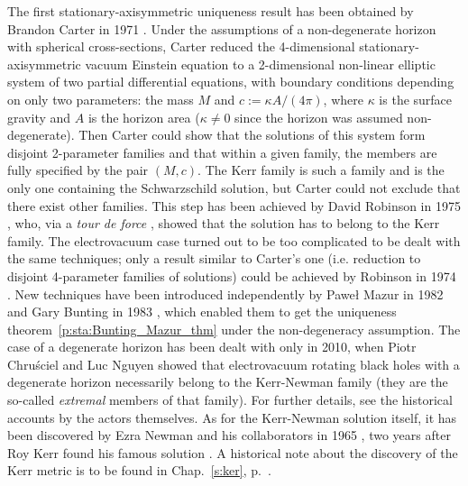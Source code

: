\begin{hist}
\label{h:sta:axisym_uniqueness}
The first stationary-axisymmetric uniqueness result has been obtained
by Brandon Carter in 1971 \cite{Carte71}. Under the
assumptions of a non-degenerate horizon with spherical cross-sections,
Carter reduced the 4-dimensional stationary-axisymmetric
vacuum Einstein equation to a 2-dimensional non-linear elliptic system
of two partial differential equations,
with boundary conditions depending on only two parameters: the mass $M$
and $c := \kappa A/(4\pi)$, where $\kappa$ is the surface gravity and $A$
is the horizon area ($\kappa \neq 0$ since the horizon was assumed non-degenerate).
Then Carter could show that the solutions
of this system form disjoint 2-parameter families and that within a given family,
the members are fully specified by the pair $(M, c)$. The Kerr family is
such a family and is the only one containing the Schwarzschild solution, but
Carter could not exclude that there exist other families. This step has been achieved
by David Robinson in 1975 \cite{Robin75}, who,
via a \emph{tour de force} \cite{Carte99}, showed
that the solution has to belong to the Kerr family.
The electrovacuum case turned out to be too complicated
to be dealt with the same techniques; only a result similar to Carter's
one (i.e. reduction to disjoint 4-parameter families of solutions)
could be achieved by Robinson in 1974 \cite{Robin74}.
New techniques have been introduced independently
by Pawe\l{} Mazur in 1982 \cite{Mazur82} and
Gary Bunting in 1983 \cite{Bunti83}, which enabled
them to get the uniqueness theorem~\ref{p:sta:Bunting_Mazur_thm}
under the non-degeneracy assumption. The case of a degenerate horizon
has been dealt with only in 2010, when Piotr Chru\'sciel
and Luc Nguyen \cite{ChrusN10}
showed that electrovacuum rotating black holes with a degenerate horizon
necessarily belong to the Kerr-Newman family (they are the so-called
\emph{extremal} members of that family).
For further details, see the historical accounts \cite{Carte99,Mazur01,Robin09}
by the actors themselves. As for the Kerr-Newman solution itself, it has
been discovered by Ezra Newman and his collaborators in 1965 \cite{Newma_al65}, two years after Roy Kerr
found his famous solution \cite{Kerr63}. A historical note about the discovery of the Kerr metric is to be found in Chap.~\ref{s:ker}, p.~\pageref{h:ker:Kerr_sol}.
\end{hist}

